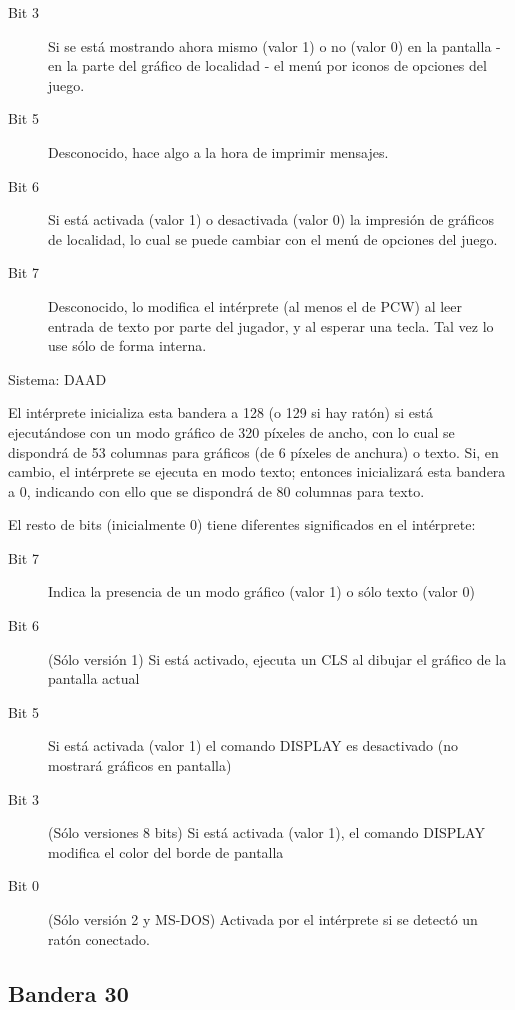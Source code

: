 \documentclass[11pt, a5paper]{article}
\newcommand{\daad}{\textsf{DAAD}\xspace}
\newcommand{\sistema}[1]{\noindent Sistema: #1 \nopagebreak}
\begin{document}
\begin{description}
  \item[Bit 3] Si se está mostrando ahora mismo (valor 1) o no (valor 0) en la pantalla - en la parte del gráfico de localidad - el menú por iconos de opciones del juego.
  \item[Bit 5] Desconocido, hace algo a la hora de imprimir mensajes.
  \item[Bit 6] Si está activada (valor 1) o desactivada (valor 0) la impresión de gráficos de localidad, lo cual se puede cambiar con el menú de opciones del juego.
  \item[Bit 7] Desconocido, lo modifica el intérprete (al menos el de PCW) al leer entrada de texto por parte del jugador, y al esperar una tecla. Tal vez lo use sólo de forma interna.
\end{description}

\sistema{\daad}

El intérprete inicializa esta bandera a 128 (o 129 si hay ratón) si está ejecutándose con un modo gráfico de 320 píxeles de ancho, con lo cual se dispondrá de 53 columnas para gráficos (de 6 píxeles de anchura) o texto. Si, en cambio, el intérprete se ejecuta en modo texto; entonces inicializará esta bandera a 0, indicando con ello que se dispondrá de 80 columnas para texto.

El resto de bits (inicialmente 0) tiene diferentes significados en el intérprete:

\begin{description}
  \item[Bit 7] Indica la presencia de un modo gráfico (valor 1) o sólo texto (valor 0)
  \item[Bit 6] (Sólo versión 1) Si está activado, ejecuta un CLS al dibujar el gráfico de la pantalla actual
  \item[Bit 5] Si está activada (valor 1) el comando DISPLAY es desactivado (no mostrará gráficos en pantalla)
  \item[Bit 3] (Sólo versiones 8 bits) Si está activada (valor 1), el comando DISPLAY modifica el color del borde de pantalla
  \item[Bit 0] (Sólo versión 2 y MS-DOS) Activada por el intérprete si se detectó un ratón conectado.
\end{description}

\subsection{Bandera 30}
\end{document}
